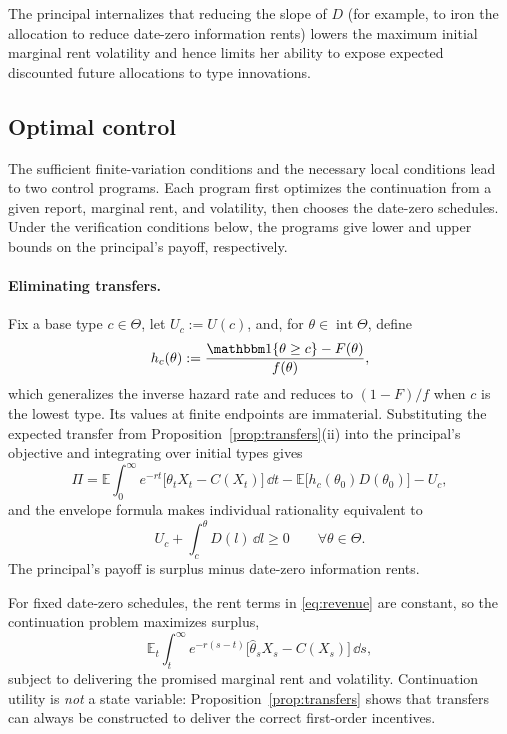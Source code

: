 \documentclass[12pt]{article}
\newcommand{\E}{\mathbb{E}}
\newcommand{\hth}{\hat\theta}
\begin{document}
The principal internalizes that reducing the slope of $D$ (for example, to iron the allocation to reduce date-zero information rents) lowers the maximum initial marginal rent
volatility and hence limits her ability to expose expected discounted
future allocations to type innovations.


\subsection{Optimal control}\label{sub:control}

The sufficient finite-variation conditions and the necessary local
conditions lead to two control programs. Each program first optimizes
the continuation from a given report, marginal rent, and volatility,
then chooses the date-zero schedules. Under the verification conditions
below, the programs give lower and upper bounds on the principal's
payoff, respectively.

\paragraph{Eliminating transfers.}
Fix a base type \(c\in\Theta\), let \(U_c:=U(c)\), and, for
\(\theta\in\operatorname{int}\Theta\), define
\[
  h_c(\theta)
  :=
  \frac{\mathbbm 1\{\theta\geq c\}-F(\theta)}{f(\theta)},
\]
which generalizes the inverse hazard rate and reduces to \((1-F)/f\)
when \(c\) is the lowest type. Its values at finite endpoints are
immaterial. Substituting the expected transfer from
Proposition~\ref{prop:transfers}\textnormal{(ii)} into the principal's
objective and integrating over initial types gives
\begin{equation}\label{eq:revenue}
  \Pi
  =
  \E\int_0^\infty e^{-rt}
    \bigl[\theta_tX_t-C(X_t)\bigr]\,\dd t
  -\E\bigl[h_c(\theta_0)D(\theta_0)\bigr]
  -U_c,
\end{equation}
and the envelope formula makes individual rationality equivalent to
\begin{equation}\label{eq:ir}
  U_c+\int_c^\theta D(l)\,\dd l
  \geq0
  \qquad\forall\theta\in\Theta.
\end{equation}
The principal's payoff is surplus minus date-zero information rents.

For fixed date-zero schedules, the rent terms in \eqref{eq:revenue}
are constant, so the continuation problem maximizes surplus,
\[
  \E_t\int_t^\infty e^{-r(s-t)}
    \bigl[\hth_sX_s-C(X_s)\bigr]\,\dd s,
\]
subject to delivering the promised marginal rent and volatility.
Continuation utility is \emph{not} a state variable:
Proposition~\ref{prop:transfers} shows that transfers can always be constructed to deliver the correct first-order incentives.
\end{document}
